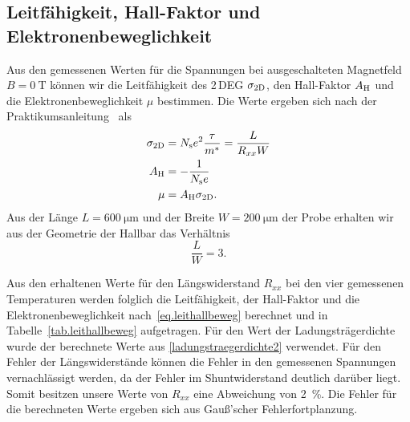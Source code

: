\documentclass[paper=a4,fontsize=10pt,DIV=18,twocolumn,parskip=half]{scrartcl}
\numberwithin{equation}{section}    %
\newcommand{\kor}[1]{{\color{darkgreen}#1}}
\begin{document}
\subsection{Leitfähigkeit, Hall-Faktor und Elektronenbeweglichkeit}
\label{a3}

Aus den gemessenen Werten für die Spannungen bei ausgeschalteten Magnetfeld $B=\SI{0}{\tesla}$ können wir die Leitfähigkeit des 2\,DEG $\sigma_{\rm 2D}$, den Hall-Faktor $A_{\rm H}$ und die Elektronenbeweglichkeit $\mu$ bestimmen. Die Werte ergeben sich nach der Praktikumsanleitung~\citep{anleitung} als
\begin{align}
	\sigma_{\rm 2D} &= N_{\rm s} e^2 \frac{\tau}{m^*} = \frac{L}{R_{xx} W}\\
	A_{\rm H} 		&= -\frac{1}{N_{\rm s}e}\\
	\mu 			&= A_{\rm H} \sigma_{\rm 2D}.
	\label{eq.leithallbeweg}
\end{align}
Aus der Länge $L=\SI{600}{\micro\meter}$ und der Breite $W=\SI{200}{\micro\meter}$ der Probe erhalten wir aus der Geometrie der Hallbar das Verhältnis
\begin{equation}
	\frac{L}{W} = 3.
\end{equation}

Aus den erhaltenen Werte für den Längswiderstand $R_{xx}$ bei den vier gemessenen Temperaturen werden folglich die Leitfähigkeit, der Hall-Faktor und die Elektronenbeweglichkeit nach~\eqref{eq.leithallbeweg} berechnet und in Tabelle~\ref{tab.leithallbeweg} aufgetragen. 
\kor{Für den Wert der Ladungsträgerdichte wurde der berechnete Werte aus \ref{ladungstraegerdichte2} verwendet.}
Für den Fehler der Längswiderstände können die Fehler in den gemessenen Spannungen vernachlässigt werden, da der Fehler im Shuntwiderstand deutlich darüber liegt. Somit besitzen unsere Werte von $R_{xx}$ eine Abweichung von \kor{\SI{2}{\percent}}. Die Fehler für die berechneten Werte ergeben sich aus Gauß'scher Fehlerfortplanzung.
\end{document}
